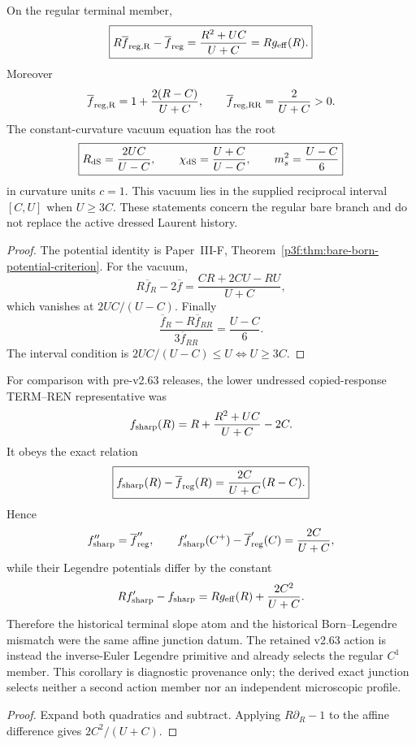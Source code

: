 \documentclass[12pt,a4paper]{article}
\begin{document}
\begin{corollary}
\label{p8:cor:conditional-bare-born-legendre}
On the regular terminal member,
\[
 \boxed{
 R\overline f_{\rm reg,R}-\overline f_{\rm reg}
 =\frac{R^2+UC}{U+C}=R g_{\rm eff}(R).}
\]
Moreover
\[
 \overline f_{\rm reg,R}
 =1+\frac{2(R-C)}{U+C},
 \qquad
 \overline f_{\rm reg,RR}=\frac{2}{U+C}>0.
\]
The constant-curvature vacuum equation has the root
\[
 \boxed{
 R_{\rm dS}=\frac{2UC}{U-C},
 \qquad
 \chi_{\rm dS}=\frac{U+C}{U-C},
 \qquad
 m_s^2=\frac{U-C}{6}}
\]
in curvature units \(c=1\).  This vacuum lies in the supplied reciprocal
interval \([C,U]\) when \(U\ge3C\).  These statements concern the regular
bare branch and do not replace the active dressed Laurent history.
\end{corollary}
\begin{proof}
The potential identity is Paper~III-F,
Theorem~\ref{p3f:thm:bare-born-potential-criterion}.  For the vacuum,
\[
 R\overline f_R-2\overline f
 =\frac{CR+2CU-RU}{U+C},
\]
which vanishes at \(2UC/(U-C)\).  Finally
\[
 \frac{\overline f_R-R\overline f_{RR}}
      {3\overline f_{RR}}
 =\frac{U-C}{6}.
\]
The interval condition is
\(2UC/(U-C)\le U\iff U\ge3C\).
\end{proof}

\begin{corollary}
\label{p8:cor:sharp-regular-terminal-affine-displacement}
For comparison with pre-v2.63 releases, the lower undressed copied-response
TERM--REN representative was
\[
 f_{\rm sharp}(R)
 =R+\frac{R^2+UC}{U+C}-2C.
\]
It obeys the exact relation
\begin{equation}
\label{p8:eq:sharp-regular-affine-difference}
 \boxed{
 f_{\rm sharp}(R)-\overline f_{\rm reg}(R)
 =\frac{2C}{U+C}(R-C).}
\end{equation}
Hence
\[
 f_{\rm sharp}''=\overline f_{\rm reg}'',
 \qquad
 f_{\rm sharp}'(C^+)-\overline f_{\rm reg}'(C)
 =\frac{2C}{U+C},
\]
while their Legendre potentials differ by the constant
\[
 R f_{\rm sharp}'-f_{\rm sharp}
 =R g_{\rm eff}(R)+\frac{2C^2}{U+C}.
\]
Therefore the historical terminal slope atom and the historical
Born--Legendre mismatch were the same affine junction datum.  The retained
v2.63 action is instead the inverse-Euler Legendre primitive and already
selects the regular \(C^1\) member.  This corollary is diagnostic provenance only; the derived exact junction
selects neither a second action member nor an independent microscopic profile.
\end{corollary}
\begin{proof}
Expand both quadratics and subtract.  Applying
\(R\partial_R-1\) to the affine difference gives
\(2C^2/(U+C)\).
\end{proof}
\end{document}

